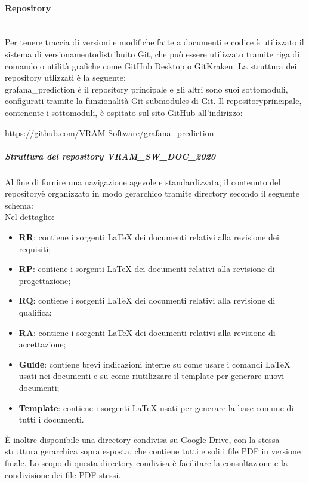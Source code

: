 	\paragraph{Repository}\mbox{}\\ [1mm]
		Per tenere traccia di versioni e modifiche fatte a documenti e codice è utilizzato il sistema di versionamento\glosp distribuito Git, che può essere utilizzato tramite riga di comando o utilità grafiche come GitHub Desktop o GitKraken.
		La struttura dei repository utlizzati è la seguente:
		\newline
		\mbox{}\\ %
		grafana\_prediction è il repository principale e gli altri sono suoi sottomoduli, configurati tramite la funzionalità Git submodules di Git.
		Il repository\glosp principale, contenente i sottomoduli, è ospitato sul sito GitHub all'indirizzo: 
		\begin{center}
			\url{https://github.com/VRAM-Software/grafana_prediction}
		\end{center}
		\subparagraph{Struttura del repository VRAM\_SW\_DOC\_2020}
		Al fine di fornire una navigazione agevole e standardizzata, il contenuto del repository\glosp è organizzato in modo gerarchico tramite directory secondo il seguente schema:
		\newline
		\mbox{}\\ %
		Nel dettaglio:
		\begin{itemize}
			\item \textbf{RR}: contiene i sorgenti \LaTeX \xspace dei documenti relativi alla revisione dei requisiti;
			\item \textbf{RP}: contiene i sorgenti \LaTeX \xspace dei documenti relativi alla revisione di progettazione\glo;
			\item \textbf{RQ}: contiene i sorgenti \LaTeX \xspace dei documenti relativi alla revisione di qualifica;
			\item \textbf{RA}: contiene i sorgenti \LaTeX \xspace dei documenti relativi alla revisione di accettazione; 
			\item \textbf{Guide}: contiene brevi indicazioni interne su come usare i comandi \LaTeX \xspace usati nei documenti e su come riutilizzare il template per generare nuovi documenti;
			\item \textbf{Template}: contiene i sorgenti \LaTeX \xspace usati per generare la base comune di tutti i documenti.
		\end{itemize}
		È inoltre disponibile una directory condivisa su Google Drive, con la stessa struttura gerarchica sopra esposta, che contiene tutti e soli i file PDF in versione finale. Lo scopo di questa directory condivisa è facilitare la consultazione e la condivisione dei file PDF stessi.
		
